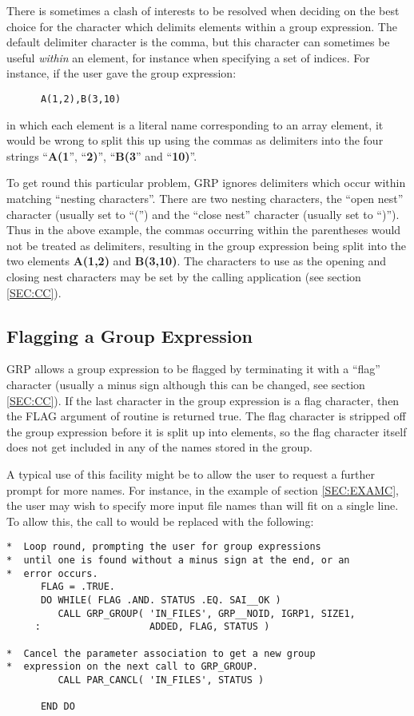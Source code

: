 There is sometimes a clash of interests to be resolved when deciding on the best
choice for the character which delimits elements within a group expression. The
default delimiter character is the comma, but this character can sometimes be
useful {\em within} an element, for instance when specifying a set of indices.
For instance, if the user gave the group expression:

\small
\begin{verbatim}
      A(1,2),B(3,10)
\end{verbatim}
\normalsize

in which each element is a literal name corresponding to an array element, it
would be wrong to split this up using the commas as delimiters into the four
strings ``{\bf A(1}'', ``{\bf 2)}'', ``{\bf B(3}'' and ``{\bf 10)}''.

To get round this particular problem, GRP ignores delimiters which occur within
matching ``nesting characters''. There are two nesting characters, the ``open
nest'' character (usually set to ``('') and the ``close nest'' character
(usually set to ``)''). Thus in the above example, the commas occurring within
the parentheses would not be treated as delimiters, resulting in the group
expression being split into the two elements {\bf A(1,2)} and {\bf B(3,10)}. The
characters to use as the opening and closing nest characters may be set by the
calling application (see section \ref{SEC:CC}).

\subsection{\label{SEC:FLAG}Flagging a Group Expression}
GRP allows a group expression to be flagged by terminating it with a ``flag''
character (usually a minus sign although this can be changed, see section
\ref{SEC:CC}). If the last character in the group expression is a flag
character, then the FLAG argument of routine  is returned true. The
flag character is stripped off the group expression before it is split up into
elements, so the flag character itself does not get included in any of the names
stored in the group.

A typical use of this facility might be to allow the user to request a further
prompt for more names. For instance, in the example of section \ref{SEC:EXAMC},
the user may wish to specify more input file names than will fit on a single
line. To allow this, the call to  would be replaced with the
following:
\small
\begin{verbatim}
*  Loop round, prompting the user for group expressions
*  until one is found without a minus sign at the end, or an
*  error occurs.
      FLAG = .TRUE.
      DO WHILE( FLAG .AND. STATUS .EQ. SAI__OK )
         CALL GRP_GROUP( 'IN_FILES', GRP__NOID, IGRP1, SIZE1,
     :                   ADDED, FLAG, STATUS )

*  Cancel the parameter association to get a new group
*  expression on the next call to GRP_GROUP.
         CALL PAR_CANCL( 'IN_FILES', STATUS )

      END DO
\end{verbatim}
\normalsize

